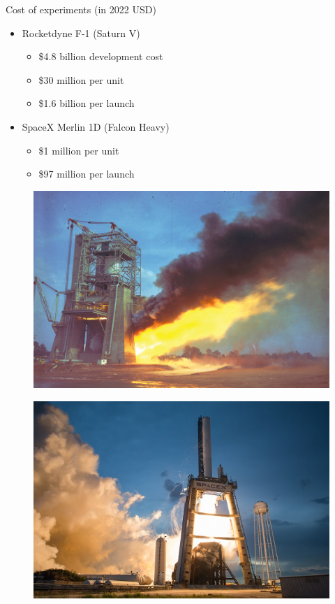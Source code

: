\documentclass[]{beamer}
\begin{document}
\begin{frame}{Cost of experiments (in 2022 USD)}
    \begin{itemize}
        \item Rocketdyne F-1 (Saturn V)
        \begin{itemize}
            \item \$4.8 billion development cost
            \item \$30 million per unit
            \item \$1.6 billion per launch
        \end{itemize}
        \item SpaceX Merlin 1D (Falcon Heavy)
        \begin{itemize}
            \item \$1 million per unit
            \item \$97 million per launch
        \end{itemize}
    \end{itemize}
	\begin{minipage}{0.49\linewidth}
		\begin{figure}
			\includegraphics[width=0.99\linewidth]{f1TestStand.jpg}
		\end{figure}
	\end{minipage}
	\begin{minipage}{0.49\linewidth}
		\begin{figure}
			\includegraphics[width=0.99\linewidth]{merlin1dTestStand.jpg}
		\end{figure}
	\end{minipage}
\end{frame}
\end{document}

